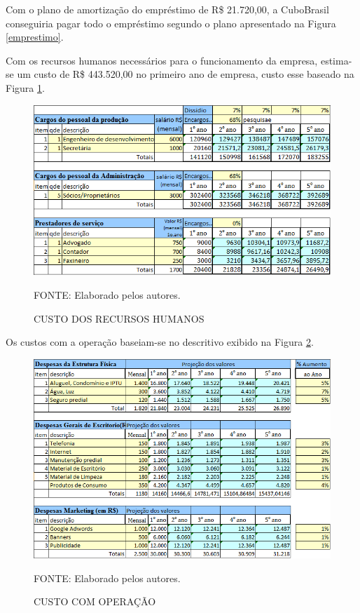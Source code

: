 \documentclass[
	12pt,				%
	openright,			%
	oneside,			%
	a4paper,			%
	english,			%
	french,				%
	spanish,			%
	brazil				%
	]{abntex2}
\begin{document}
	Com o plano de amortização do empréstimo de R\$ 21.720,00, a CuboBrasil conseguiria pagar todo o empréstimo segundo o plano apresentado na Figura \ref{emprestimo}.
	
	Com os recursos humanos necessários para o funcionamento da empresa, estima-se um custo de R\$ 443.520,00 no primeiro ano de empresa, custo esse baseado na Figura \ref{recuroso_humanos}.
	
	\begin{figure}[th]
		\caption{CUSTO DOS RECURSOS HUMANOS}
		\label{recuroso_humanos}
		\centering
		\includegraphics[width=0.8\linewidth]{./figs/recuroso_humanos}
		
		\begin{small}
			FONTE: Elaborado pelos autores.
		\end{small}
	\end{figure}

	Os custos com a operação baseiam-se no descritivo exibido na Figura \ref{operacao}.
	
	\begin{figure}[th]
		\caption{CUSTO COM OPERAÇÃO}
		\label{operacao}
		\centering
		\includegraphics[width=0.8\linewidth]{./figs/operacao}
		
		\begin{small}
			FONTE: Elaborado pelos autores.
		\end{small}
	\end{figure}
	\pagebreak
	
\end{document}
